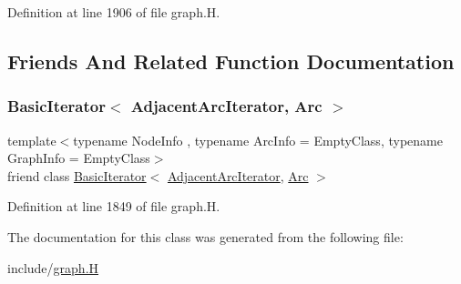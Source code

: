 Definition at line 1906 of file graph.\+H.



\subsection{Friends And Related Function Documentation}
\mbox{\label{class_designar_1_1_digraph_1_1_adjacent_arc_iterator_a73ad70d76f3331ee4b07451db1347918}} 
\subsubsection{\texorpdfstring{Basic\+Iterator$<$ Adjacent\+Arc\+Iterator, Arc $>$}{BasicIterator< AdjacentArcIterator, Arc >}}
{\footnotesize\ttfamily template$<$typename Node\+Info , typename Arc\+Info  = Empty\+Class, typename Graph\+Info  = Empty\+Class$>$ \\
friend class \hyperlink{class_designar_1_1_basic_iterator}{Basic\+Iterator}$<$ \hyperlink{class_designar_1_1_digraph_1_1_adjacent_arc_iterator}{Adjacent\+Arc\+Iterator}, \hyperlink{class_designar_1_1_digraph_a0ceb278671f2a535c00fddccdeafd69f}{Arc} $>$\hspace{0.3cm}{\ttfamily [friend]}}



Definition at line 1849 of file graph.\+H.



The documentation for this class was generated from the following file\+:\begin{DoxyCompactItemize}
\item 
include/\hyperlink{graph_8_h}{graph.\+H}\end{DoxyCompactItemize}
